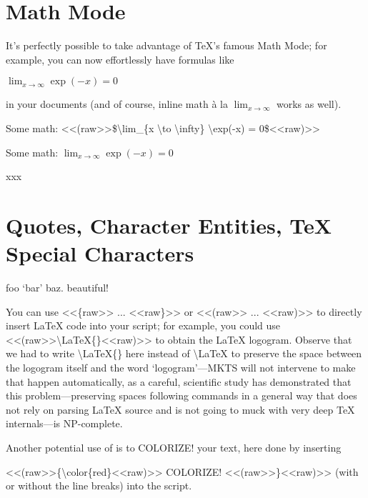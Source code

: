 \section{Math Mode
}
\begin{multicols}{2}It’s perfectly possible to take advantage of
\TeX{}'s famous Math Mode; for example,
you can now effortlessly have formulas like\mktsShowpar\par
$\lim_{x \to \infty} \exp(-x) = 0$\mktsShowpar\par
in your documents (and of course, inline math {\mktsStyleItalic{}à la\/}
$\lim_{x \to \infty}$ works as well).\mktsShowpar\par
\end{multicols}\mktsShowpar\par
Some math: {\mktsStyleCode{}<<(raw>>\$\textbackslash{}lim\_\{x \textbackslash{}to \textbackslash{}infty\} \textbackslash{}exp(-x) = 0\$<<raw)>>}\mktsShowpar\par
Some math: $\lim_{x \to \infty} \exp(-x) = 0$\mktsShowpar\par
xxx\mktsShowpar\par

\section{Quotes, Character Entities, \TeX{} Special Characters
}
foo ‘bar’ baz.  beautiful!\mktsShowpar\par
\mktsShowpar\par
\begin{multicols}{2}
You can use {\mktsStyleCode{}<<\{raw>> ... <<raw\}>>} or {\mktsStyleCode{}<<(raw>> ... <<raw)>>} to directly insert \LaTeX{}
code into your script; for example, you could
use {\mktsStyleCode{}<<(raw>>\textbackslash{}LaTeX\{\}<<raw)>>}
to obtain the \LaTeX{} logogram.
Observe that we had to write {\mktsStyleCode{}\textbackslash{}LaTeX\{\}} here instead of {\mktsStyleCode{}\textbackslash{}LaTeX} to preserve the space between the logogram itself and
the word ‘logogram’—{\mktsStyleBold{}MKTS} will not intervene to make that happen
automatically, as a careful, scientific study has demonstrated
that this problem—preserving spaces following commands in a
general way that does not rely on parsing \LaTeX{}
source and is not going to muck with very deep
\TeX{}
internals—is NP-complete.\mktsShowpar\par
Another potential use of  is to {\color{red}COLORIZE!} your text, here done by inserting\mktsShowpar\par
\begingroup\obeyalllines\mktsStyleCode{}<<(raw>>\{\textbackslash{}color\{red\}<<raw)>>
COLORIZE!
<<(raw>>\}<<raw)>>
\endgroup{}(with or without the line breaks) into the script.
\end{multicols}\mktsShowpar\par

